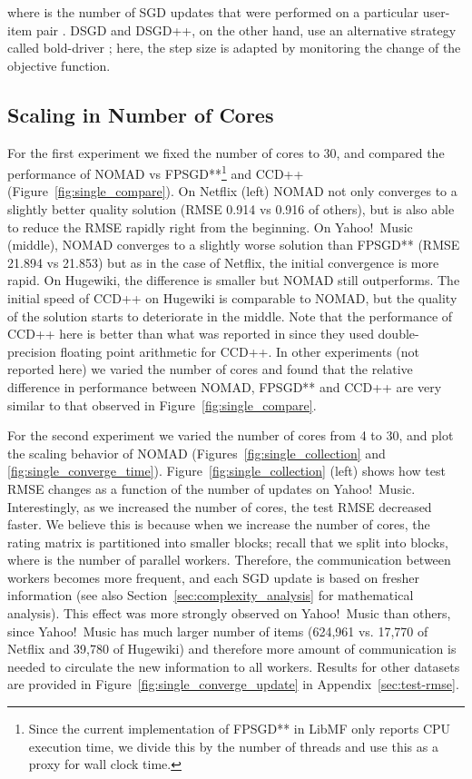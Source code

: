\documentclass{vldb}
\begin{document}
where  is the number of SGD updates that were performed on a
particular user-item pair .  DSGD and DSGD++, on the other
hand, use an alternative strategy called bold-driver
\citep{GemNijHaaSis11}; here, the step size is adapted by monitoring
the change of the objective function. 




\subsection{Scaling in Number of Cores}
\label{sec:ScalingNumberCores}

For the first experiment we fixed the number of cores to 30, and
compared the performance of NOMAD vs FPSGD**\footnote{Since the current
  implementation of FPSGD** in LibMF only reports CPU execution time, we
  divide this by the number of threads and use this as a proxy for wall
  clock time.} and CCD++ (Figure~\ref{fig:single_compare}).  On Netflix
(left) NOMAD not only converges to a slightly better quality solution
(RMSE 0.914 vs 0.916 of others), but is also able to reduce the RMSE
rapidly right from the beginning.  On Yahoo!\ Music (middle), NOMAD
converges to a slightly worse solution than FPSGD** (RMSE 21.894 vs
21.853) but as in the case of Netflix, the initial convergence is more
rapid.  On Hugewiki, the difference is smaller but NOMAD still
outperforms.  The initial speed of CCD++ on Hugewiki is comparable to
NOMAD, but the quality of the solution starts to deteriorate in the
middle.  Note that the performance of CCD++ here is better than what was
reported in \citet{ZhuChiJuaLin13} since they used double-precision
floating point arithmetic for CCD++.  In other experiments (not reported
here) we varied the number of cores and found that the relative
difference in performance between NOMAD, FPSGD** and CCD++ are very
similar to that observed in Figure~\ref{fig:single_compare}.

For the second experiment we varied the number of cores from 4 to 30,
and plot the scaling behavior of NOMAD
(Figures~\ref{fig:single_collection} and
\ref{fig:single_converge_time}).  Figure~\ref{fig:single_collection}
(left) shows how test RMSE changes as a function of the number of
updates on Yahoo!~Music.  Interestingly, as we increased the number of
cores, the test RMSE decreased faster.  We believe this is because when
we increase the number of cores, the rating matrix  is partitioned
into smaller blocks; recall that we split  into  blocks,
where  is the number of parallel workers.  Therefore, the
communication between workers becomes more frequent, and each SGD update
is based on fresher information (see also
Section~\ref{sec:complexity_analysis} for mathematical analysis).  This
effect was more strongly observed on Yahoo!~Music than others, since
Yahoo!~Music has much larger number of items (624,961 vs. 17,770 of
Netflix and 39,780 of Hugewiki) and therefore more amount of
communication is needed to circulate the new information to all workers.
Results for other datasets are provided in
Figure~\ref{fig:single_converge_update} in Appendix~\ref{sec:test-rmse}.
\end{document}
